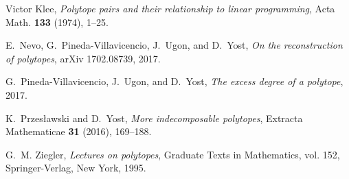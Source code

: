 \documentclass[a4paper]{amsart}
\theoremstyle{definition}
\theoremstyle{remark}
\begin{document}
\begin{thebibliography}{10}
Victor Klee, \emph{Polytope pairs and their relationship to linear
  programming}, Acta Math. \textbf{133} (1974), 1--25. 

E.~Nevo, G.~Pineda-Villavicencio, J.~Ugon, and D.~Yost, \emph{On the
  reconstruction of polytopes}, arXiv 1702.08739, 2017.

G.~Pineda-Villavicencio, J.~Ugon, and D.~Yost, \emph{The excess degree of a
  polytope}, 2017.

K.~Przes{\l}awski and D.~Yost, \emph{More indecomposable polytopes}, Extracta
  Mathematicae \textbf{31} (2016), 169--188.

G.~M. Ziegler, \emph{Lectures on polytopes}, Graduate Texts in Mathematics,
  vol. 152, Springer-Verlag, New York, 1995. 

\end{thebibliography}
\end{document}

